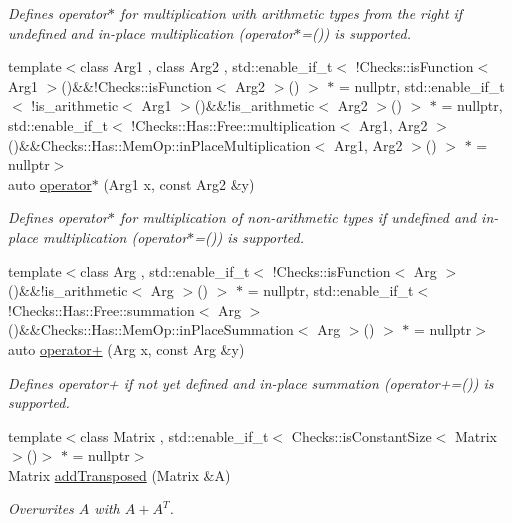 \begin{DoxyCompactItemize}
\begin{DoxyCompactList}\small\item\em \-Defines operator$\ast$ for multiplication with arithmetic types from the right if undefined and in-\/place multiplication (operator$\ast$=()) is supported. \end{DoxyCompactList}\item 
{\footnotesize template$<$class Arg1 , class Arg2 , std\-::enable\-\_\-if\-\_\-t$<$ !\-Checks\-::is\-Function$<$ Arg1 $>$()\&\&!\-Checks\-::is\-Function$<$ Arg2 $>$() $>$ $\ast$  = nullptr, std\-::enable\-\_\-if\-\_\-t$<$ !is\-\_\-arithmetic$<$ Arg1 $>$()\&\&!is\-\_\-arithmetic$<$ Arg2 $>$() $>$ $\ast$  = nullptr, std\-::enable\-\_\-if\-\_\-t$<$ !\-Checks\-::\-Has\-::\-Free\-::multiplication$<$ Arg1, Arg2 $>$()\&\&\-Checks\-::\-Has\-::\-Mem\-Op\-::in\-Place\-Multiplication$<$ Arg1, Arg2 $>$() $>$ $\ast$  = nullptr$>$ }\\auto \hyperlink{namespaceFunG_ad023f2d2273af693f2b4ebceeb296dc8}{operator$\ast$} (\-Arg1 x, const \-Arg2 \&y)
\begin{DoxyCompactList}\small\item\em \-Defines operator$\ast$ for multiplication of non-\/arithmetic types if undefined and in-\/place multiplication (operator$\ast$=()) is supported. \end{DoxyCompactList}\item 
{\footnotesize template$<$class Arg , std\-::enable\-\_\-if\-\_\-t$<$ !\-Checks\-::is\-Function$<$ Arg $>$()\&\&!is\-\_\-arithmetic$<$ Arg $>$() $>$ $\ast$  = nullptr, std\-::enable\-\_\-if\-\_\-t$<$ !\-Checks\-::\-Has\-::\-Free\-::summation$<$ Arg $>$()\&\&\-Checks\-::\-Has\-::\-Mem\-Op\-::in\-Place\-Summation$<$ Arg $>$() $>$ $\ast$  = nullptr$>$ }\\auto \hyperlink{namespaceFunG_a063d3e8c19dbea3ee1396736fecb64e1}{operator+} (\-Arg x, const \-Arg \&y)
\begin{DoxyCompactList}\small\item\em \-Defines operator+ if not yet defined and in-\/place summation (operator+=()) is supported. \end{DoxyCompactList}\item 
{\footnotesize template$<$class Matrix , std\-::enable\-\_\-if\-\_\-t$<$ Checks\-::is\-Constant\-Size$<$ Matrix $>$()$>$ $\ast$  = nullptr$>$ }\\\-Matrix \hyperlink{namespaceFunG_a0211d0d26c669d56b5113fd2292902e5}{add\-Transposed} (\-Matrix \&\-A)
\begin{DoxyCompactList}\small\item\em \-Overwrites $A$ with $A+A^T$. \end{DoxyCompactList}\item 

\end{DoxyCompactItemize}
